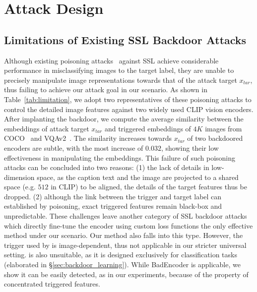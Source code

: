 \section{Attack Design}
\label{sec:method}
\subsection{Limitations of Existing SSL Backdoor Attacks}
\label{sec:limitations}
Although existing poisoning attacks~\cite{carlini2021poisoning,liang2024badclip,zhang2024data} against SSL achieve considerable performance in misclassifying images to the target label, they are unable to precisely manipulate image representations towards that of the attack target $x_{tar}$, thus failing to achieve our attack goal in our scenario. As shown in Table~\ref{tab:limitation}, we adopt two representatives of these poisoning attacks to control the detailed image features against two widely used CLIP vision encoders. After implanting the backdoor, we compute the average similarity between the embeddings of attack target $x_{tar}$ and triggered embeddings of $4K$ images from COCO~\cite{chen2015microsoft} and VQAv2~\cite{goyal2017making}. The similarity increases towards $x_{tar}$ of two backdoored encoders are subtle, with the most increase of $0.032$, showing their low effectiveness in manipulating the embeddings. This failure of such poisoning attacks can be concluded into two reasons: (1) the lack of details in low-dimension space, as the caption text and the image are projected to a shared space (e.g. $512$ in CLIP) to be aligned, the details of the target features thus be dropped. (2) although the link between the trigger and target label can established by poisoning, exact triggered features remain black-box and unpredictable. These challenges leave another category of SSL backdoor attacks \cite{jia2022badencoder,wang2024ghostencoder,tao2023distribution} which directly fine-tune the encoder using custom loss functions the only effective method under our scenario. Our method also falls into this type. However, the trigger used by \cite{wang2024ghostencoder} is image-dependent, thus not applicable in our stricter universal setting. \cite{tao2023distribution} is also unsuitable, as it is designed exclusively for classification tasks (elaborated in \S\ref{sec:backdoor_learning}). While BadEncoder \cite{jia2022badencoder} is applicable, we show it can be easily detected, as in our experiments, because of the property of concentrated triggered features.
